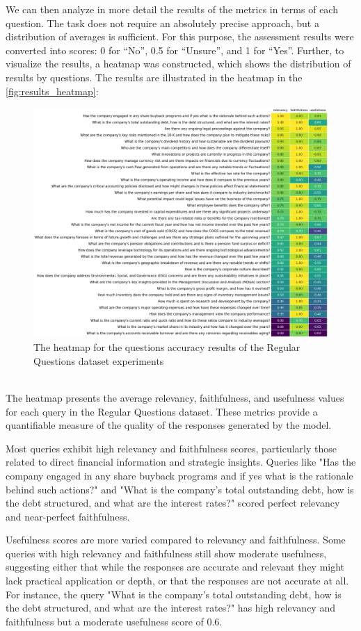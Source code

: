 We can then analyze in more detail the results of the metrics in terms of each question. The task does not require an absolutely precise approach, but a distribution of averages is sufficient. For this purpose, the assessment results were converted into scores: 0 for “No”, 0.5 for “Unsure”, and 1 for “Yes”. Further, to visualize the results, a heatmap was constructed, which shows the distribution of results by questions. The results are illustrated in the heatmap in the \autoref{fig:results_heatmap}:
\begin{figure}[H]
\centering
\includegraphics[width=1\textwidth]{Figures/results_heatmap.png}
\caption{The heatmap for the questions accuracy results of the Regular Questions dataset experiments}
\label{fig:results_heatmap}
\end{figure}
\\
The heatmap presents the average relevancy, faithfulness, and usefulness values for each query in the Regular Questions dataset. These metrics provide a quantifiable measure of the quality of the responses generated by the model.

Most queries exhibit high relevancy and faithfulness scores, particularly those related to direct financial information and strategic insights. Queries like "Has the company engaged in any share buyback programs and if yes what is the rationale behind such actions?" and "What is the company's total outstanding debt, how is the debt structured, and what are the interest rates?" scored perfect relevancy and near-perfect faithfulness.

Usefulness scores are more varied compared to relevancy and faithfulness. Some queries with high relevancy and faithfulness still show moderate usefulness, suggesting either that while the responses are accurate and relevant they might lack practical application or depth, or that the responses are not accurate at all. For instance, the query "What is the company's total outstanding debt, how is the debt structured, and what are the interest rates?" has high relevancy and faithfulness but a moderate usefulness score of 0.6.

